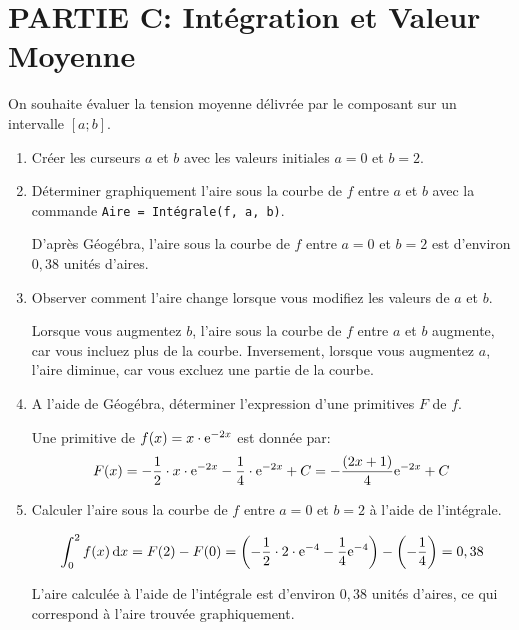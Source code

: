 \documentclass[11pt, a4paper]{report}
\begin{document}
\section*{PARTIE C\@: Intégration et Valeur Moyenne}

On souhaite évaluer la tension moyenne délivrée par le composant sur un intervalle $[a ; b]$.

\begin{enumerate}[resume]
    \item Créer les curseurs $a$ et $b$ avec les valeurs initiales $a=0$ et $b=2$.  
    \item Déterminer graphiquement l'aire sous la courbe de $f$ entre $a$ et $b$ avec la commande \verb|Aire = Intégrale(f, a, b)|.  
    \begin{blocvisible}[height=2]
        D'après Géogébra, l'aire sous la courbe de $f$ entre $a=0$ et $b=2$ est d'environ $0,38$ unités d'aires.
    \end{blocvisible}
        
    \item Observer comment l'aire change lorsque vous modifiez les valeurs de $a$ et $b$. 
    \begin{blocvisible}[height=3]
        Lorsque vous augmentez $b$, l'aire sous la courbe de $f$ entre $a$ et $b$ augmente, car vous incluez plus de la courbe. Inversement, lorsque vous augmentez $a$, l'aire diminue, car vous excluez une partie de la courbe.
    \end{blocvisible}

    \item A l'aide de Géogébra, déterminer l'expression d'une primitives $F$ de $f$. 
    \begin{blocvisible}[height=2]
        Une primitive de $f(x) = x \cdot\mathrm{e}^{-2x}$ est donnée par:
        \[F(x) = -\frac{1}{2}\cdot x \cdot\mathrm{e}^{-2x} - \frac{1}{4}\cdot \mathrm{e}^{-2x} + C= -\frac{(2x + 1)}{4}\mathrm{e}^{-2x} + C\]
    \end{blocvisible}

    \item Calculer l'aire sous la courbe de $f$ entre $a=0$ et $b=2$ à l'aide de l'intégrale. 
    \begin{blocvisible}[height=3]
        \[\int_0^2 f(x) \,\mathrm{d}x = F(2) - F(0) = \left(-\frac{1}{2} \cdot 2 \cdot \mathrm{e}^{-4} - \frac{1}{4} \mathrm{e}^{-4}\right) - \left(-\frac{1}{4}\right) = 0,38\]

        L'aire calculée à l'aide de l'intégrale est d'environ $0,38$ unités d'aires, ce qui correspond à l'aire trouvée graphiquement.
    \end{blocvisible}
    

\end{enumerate}
\end{document}
